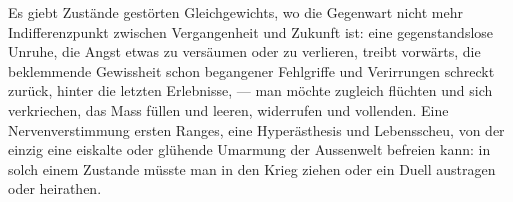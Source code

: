 Es giebt Zustände gestörten Gleichgewichts, wo die Gegenwart nicht mehr Indifferenzpunkt zwischen Vergangenheit und Zukunft ist: eine gegenstandslose Unruhe, die Angst etwas zu versäumen oder zu verlieren, treibt vorwärts, die beklemmende Gewissheit schon begangener Fehlgriffe und Verirrungen schreckt zurück, hinter die letzten Erlebnisse, — man möchte zugleich flüchten und sich verkriechen, das Mass füllen und leeren, widerrufen und vollenden. Eine Nervenverstimmung ersten Ranges, eine Hyperästhesis und Lebensscheu, von der einzig eine eiskalte oder glühende Umarmung der Aussenwelt befreien kann: in solch einem Zustande müsste man in den Krieg ziehen oder ein Duell austragen oder heirathen.
\par

